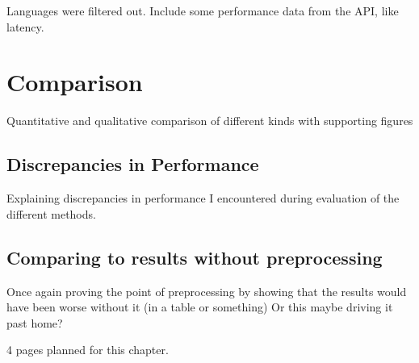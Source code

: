 Languages were filtered out.
Include some performance data from the API, like latency.

\section{Comparison}
\label{sec:comparison}

Quantitative and qualitative comparison of different kinds with supporting figures

\subsection{Discrepancies in Performance}
\label{subsec:discrepanciesinperformance}

Explaining discrepancies in performance I encountered during evaluation of the different methods.

\subsection{Comparing to results without preprocessing}
\label{subsec:comparingToResultsWithoutPreprocessing}

Once again proving the point of preprocessing by showing that the results would have been worse without it (in a table or something)
Or this maybe driving it past home?

4 pages planned for this chapter.
\pagebreak[4]
